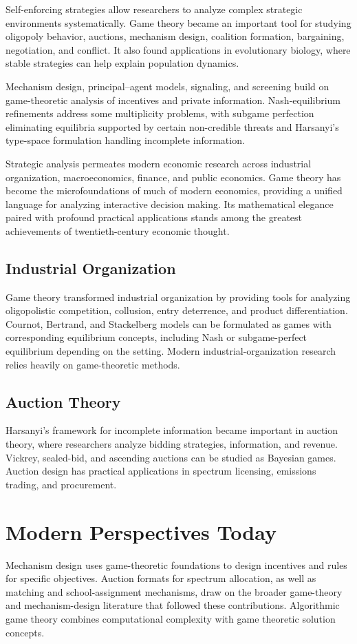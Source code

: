 Self-enforcing strategies allow researchers to analyze complex strategic
environments systematically. Game theory became an important tool for studying
oligopoly behavior, auctions, mechanism design, coalition formation,
bargaining, negotiation, and conflict. It also found applications in
evolutionary biology, where stable strategies can help explain population
dynamics.

Mechanism design, principal--agent models, signaling, and screening build on
game-theoretic analysis of incentives and private information. Nash-equilibrium
refinements address some multiplicity problems, with subgame perfection
eliminating equilibria supported by certain non-credible threats and Harsanyi's
type-space formulation handling incomplete information.

Strategic analysis permeates modern economic research across industrial
organization, macroeconomics, finance, and public economics. Game theory has
become the microfoundations of much of modern economics, providing a unified
language for analyzing interactive decision making. Its mathematical elegance
paired with profound practical applications stands among the greatest achievements
of twentieth-century economic thought.

\subsection*{Industrial Organization}
Game theory transformed industrial organization by providing tools for analyzing
oligopolistic competition, collusion, entry deterrence, and product differentiation.
Cournot, Bertrand, and Stackelberg models can be formulated as games with
corresponding equilibrium concepts, including Nash or subgame-perfect
equilibrium depending on the setting. Modern industrial-organization research
relies heavily on game-theoretic methods.

\subsection*{Auction Theory}
Harsanyi's framework for incomplete information became important in auction
theory, where researchers analyze bidding strategies, information, and revenue.
Vickrey, sealed-bid, and ascending auctions can be studied as Bayesian games.
Auction design has practical applications in spectrum licensing, emissions
trading, and procurement.

\section{Modern Perspectives Today}
Mechanism design uses game-theoretic foundations to design incentives and rules
for specific objectives. Auction formats for spectrum allocation, as well as
matching and school-assignment mechanisms, draw on the broader game-theory and
mechanism-design literature that followed these contributions.
Algorithmic game theory combines computational complexity with game theoretic
solution concepts.

